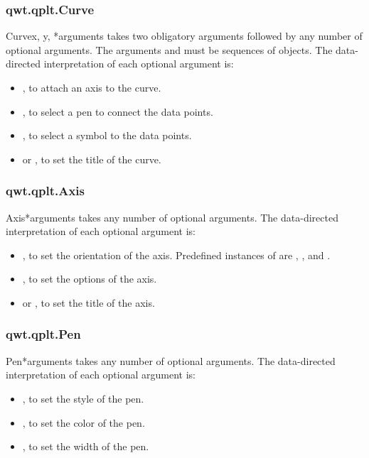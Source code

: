 \documentclass{manual}
\begin{document}
\subsubsection{qwt.qplt.Curve \label{intro-qplt-curve}}

\begin{classdesc}{Curve}{x, y, *arguments}
   takes two obligatory arguments followed by any number of
  optional arguments. The arguments  and  must be sequences
  of  objects.
  The data-directed interpretation of each optional argument is:
  \begin{itemize}
  \item
    , to attach an axis to the curve.
  \item
    , to select a pen to connect the data points.
  \item
    , to select a symbol to the data points.
  \item
     or , to set the title of the curve.
  \end{itemize}
\end{classdesc}

\subsubsection{qwt.qplt.Axis \label{intro-qplt-axis}}

\begin{classdesc}{Axis}{*arguments}
   takes any number of optional arguments.
  The data-directed interpretation of each optional argument is:
  \begin{itemize}
  \item
    , to set the orientation of the axis.  Predefined
    instances of  are , ,
     and .
  \item
    , to set the options of the axis.
  \item
     or , to set the title of the axis.
  \end{itemize}
\end{classdesc}

\subsubsection{qwt.qplt.Pen \label{intro-qplt-pen}}

\begin{classdesc}{Pen}{*arguments}
   takes any number of optional arguments.
  The data-directed interpretation of each optional argument is:
  \begin{itemize}
  \item
    , to set the style of the pen.
  \item
    , to set the color of the pen.
  \item
    , to set the width of the pen.
  \end{itemize}
\end{classdesc}
\end{document}
